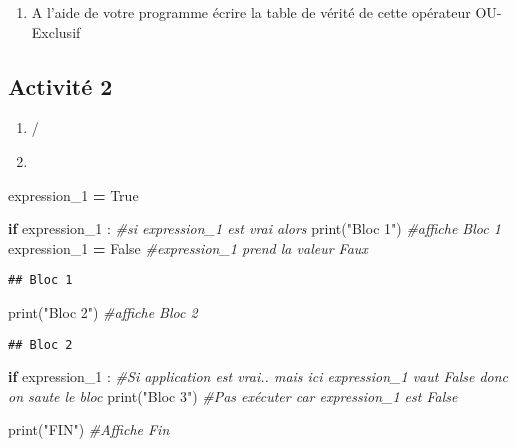 \documentclass[
]{book}
\newenvironment{Shaded}{\begin{snugshade}}{\end{snugshade}}
\newcommand{\BuiltInTok}[1]{#1}
\newcommand{\CommentTok}[1]{\textcolor[rgb]{0.56,0.35,0.01}{\textit{#1}}}
\newcommand{\ControlFlowTok}[1]{\textcolor[rgb]{0.13,0.29,0.53}{\textbf{#1}}}
\newcommand{\NormalTok}[1]{#1}
\newcommand{\OperatorTok}[1]{\textcolor[rgb]{0.81,0.36,0.00}{\textbf{#1}}}
\newcommand{\StringTok}[1]{\textcolor[rgb]{0.31,0.60,0.02}{#1}}
\newcommand{\VariableTok}[1]{\textcolor[rgb]{0.00,0.00,0.00}{#1}}
\providecommand{\tightlist}{%
  \setlength{\itemsep}{0pt}\setlength{\parskip}{0pt}}
\def\tightlist{}
\begin{document}
\begin{enumerate}
\def\labelenumi{\arabic{enumi}.}
\setcounter{enumi}{4}
\tightlist
\item
  A l'aide de votre programme écrire la table de vérité de cette opérateur OU-Exclusif
\end{enumerate}

\hypertarget{activituxe9-2}{%
\subsection{Activité 2}\label{activituxe9-2}}

\begin{enumerate}
\def\labelenumi{\arabic{enumi}.}
\tightlist
\item
  /
\item
\end{enumerate}

\begin{Shaded}
\begin{Highlighting}[]
\NormalTok{expression\_1 }\OperatorTok{=} \VariableTok{True}

\ControlFlowTok{if}\NormalTok{ expression\_1 : }\CommentTok{\#si expression\_1 est vrai alors}
  \BuiltInTok{print}\NormalTok{(}\StringTok{"Bloc 1"}\NormalTok{) }\CommentTok{\#affiche Bloc 1}
\NormalTok{  expression\_1 }\OperatorTok{=} \VariableTok{False} \CommentTok{\#expression\_1 prend la valeur Faux}
\end{Highlighting}
\end{Shaded}

\begin{verbatim}
## Bloc 1
\end{verbatim}

\begin{Shaded}
\begin{Highlighting}[]
\BuiltInTok{print}\NormalTok{(}\StringTok{"Bloc 2"}\NormalTok{) }\CommentTok{\#affiche Bloc 2}
\end{Highlighting}
\end{Shaded}

\begin{verbatim}
## Bloc 2
\end{verbatim}

\begin{Shaded}
\begin{Highlighting}[]
\ControlFlowTok{if}\NormalTok{ expression\_1 : }\CommentTok{\#Si application est vrai.. mais ici expression\_1 vaut False donc on saute le bloc}
  \BuiltInTok{print}\NormalTok{(}\StringTok{"Bloc 3"}\NormalTok{) }\CommentTok{\#Pas exécuter car expression\_1 est False}

\BuiltInTok{print}\NormalTok{(}\StringTok{"FIN"}\NormalTok{) }\CommentTok{\#Affiche Fin}
\end{Highlighting}
\end{Shaded}
\end{document}
